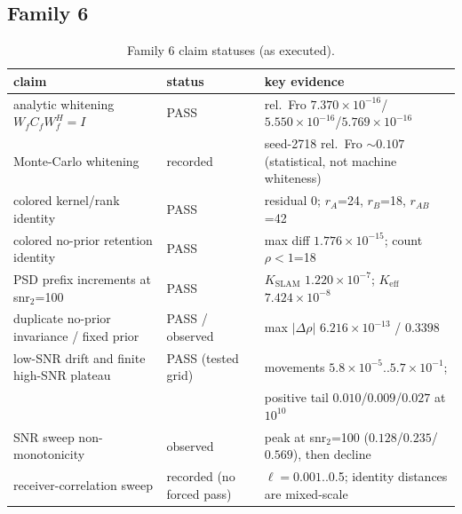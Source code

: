 \documentclass[12pt]{article}
\begin{document}
\subsection{Family 6}
\begin{table}[ht]
\centering
\small
\caption{Family 6 claim statuses (as executed).}
\label{app:tab:f6}
\begin{tabular}{p{} p{} p{}}
\toprule
claim & status & key evidence \\
\midrule
analytic whitening $W_fC_fW_f^H=I$ & PASS &
rel.\ Fro $7.370\times10^{-16}$/$5.550\times10^{-16}$/$5.769\times10^{-16}$ \\
Monte-Carlo whitening & recorded &
seed-2718 rel.\ Fro $\sim0.107$ (statistical, not machine whiteness) \\
colored kernel/rank identity & PASS &
residual 0; $r_A$=24, $r_B$=18, $r_{AB}$=42 \\
colored no-prior retention identity & PASS &
max diff $1.776\times10^{-15}$; count $\rho<1$=18 \\
PSD prefix increments at snr$_2$=100 & PASS &
$K_{\mathrm{SLAM}}$ $1.220\times10^{-7}$; $K_{\mathrm{eff}}$ $7.424\times10^{-8}$ \\
duplicate no-prior invariance / fixed prior & PASS / observed &
max $|\Delta\rho|$ $6.216\times10^{-13}$ / $0.3398$ \\
low-SNR drift and finite high-SNR plateau & PASS (tested grid) &
movements $5.8\times10^{-5}$..$5.7\times10^{-1}$; \\
 & & positive tail $0.010$/$0.009$/$0.027$ at $10^{10}$ \\
SNR sweep non-monotonicity & observed & peak at snr$_2$=100
($0.128$/$0.235$/$0.569$), then decline \\
receiver-correlation sweep & recorded (no forced pass) &
$\ell=0.001$..0.5; identity distances are mixed-scale \\
\bottomrule
\end{tabular}
\end{table}
\end{document}
